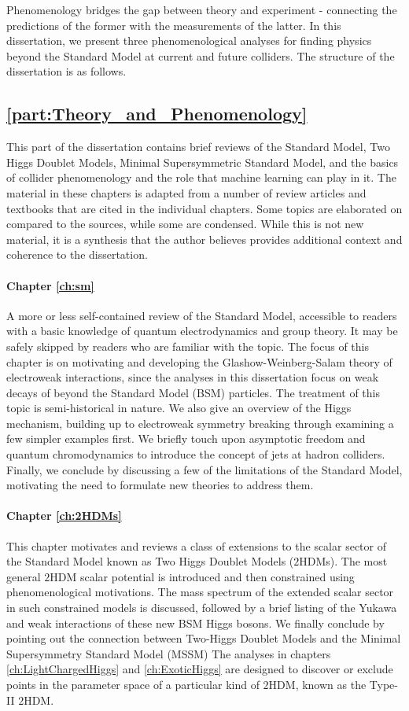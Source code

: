 Phenomenology bridges the gap between theory and experiment - connecting the predictions of the former with the measurements of the latter. In this dissertation, we present three phenomenological analyses for finding physics beyond the Standard Model at current and future colliders. The structure of the dissertation is as follows.

\subsection{\autoref{part:Theory_and_Phenomenology}}
This part of the dissertation contains brief reviews of the Standard Model, Two Higgs Doublet Models, Minimal Supersymmetric Standard Model, and the basics of collider phenomenology and the role that machine learning can play in it. The material in these chapters is adapted from a number of review articles and textbooks that are cited in the individual chapters. Some topics are elaborated on compared to the sources, while some are condensed.  While this is not new material, it is a synthesis that the author believes provides additional context and coherence to the dissertation.
\paragraph{Chapter \ref{ch:sm}} A more or less self-contained review of the Standard Model, accessible to readers with a basic knowledge of quantum electrodynamics and group theory. It may be safely skipped by readers who are familiar with the topic. The focus of this chapter is on motivating and developing the Glashow-Weinberg-Salam theory of electroweak interactions, since the analyses in this dissertation focus on weak decays of beyond the Standard Model (BSM) particles. The treatment of this topic is semi-historical in nature. We also give an overview of the Higgs mechanism, building up to electroweak symmetry breaking through examining a few simpler examples first. We briefly touch upon asymptotic freedom and quantum chromodynamics to introduce the concept of jets at hadron colliders. Finally, we conclude by discussing a few of the limitations of the Standard Model, motivating the need to formulate new theories to address them.
\paragraph{Chapter \ref{ch:2HDMs}} This chapter motivates and reviews a class of extensions to the scalar sector of the Standard Model known as Two Higgs Doublet Models ($2$HDMs). The most general $2$HDM scalar potential is introduced and then constrained using phenomenological motivations. The mass spectrum of the extended scalar sector in such constrained models is discussed, followed by a brief listing of the Yukawa and weak interactions of these new BSM Higgs bosons. We finally conclude by pointing out the connection between Two-Higgs Doublet Models and the Minimal Supersymmetry Standard Model (MSSM) The analyses in chapters \ref{ch:LightChargedHiggs} and \ref{ch:ExoticHiggs} are designed to discover or exclude points in the parameter space of a particular kind of $2$HDM, known as the Type-II $2$HDM.
